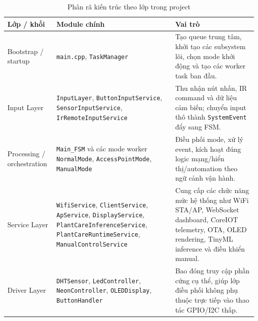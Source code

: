 \begin{table}[H]
\centering
\small
\begin{tabular}{|p{2.6cm}|p{4.8cm}|p{7.0cm}|}
\hline
\textbf{Lớp / khối} & \textbf{Module chính} & \textbf{Vai trò} \\
\hline
Bootstrap / startup & \texttt{main.cpp}, \texttt{TaskManager} & Tạo queue trung tâm, khởi tạo các subsystem lõi, chọn mode khởi động và tạo các worker task ban đầu. \\
\hline
Input Layer & \texttt{InputLayer}, \texttt{ButtonInputService}, \texttt{SensorInputService}, \texttt{IrRemoteInputService} & Thu nhận nút nhấn, IR command và dữ liệu cảm biến; chuyển input thô thành \texttt{SystemEvent} đẩy sang FSM. \\
\hline
Processing / orchestration & \texttt{Main\_FSM} và các mode worker \texttt{NormalMode}, \texttt{AccessPointMode}, \texttt{ManualMode} & Điều phối mode, xử lý event, kích hoạt đúng logic mạng/hiển thị/automation theo ngữ cảnh vận hành. \\
\hline
Service Layer & \texttt{WifiService}, \texttt{ClientService}, \texttt{ApService}, \texttt{DisplayService}, \texttt{PlantCareInferenceService}, \texttt{PlantCareRuntimeService}, \texttt{ManualControlService} & Cung cấp các chức năng mức hệ thống như WiFi STA/AP, WebSocket dashboard, CoreIOT telemetry, OTA, OLED rendering, TinyML inference và điều khiển manual. \\
\hline
Driver Layer & \texttt{DHTSensor}, \texttt{LedController}, \texttt{NeonController}, \texttt{OLEDDisplay}, \texttt{ButtonHandler} & Bao đóng truy cập phần cứng cụ thể, giúp lớp điều phối không phụ thuộc trực tiếp vào thao tác GPIO/I2C thấp. \\
\hline
\end{tabular}
\caption{Phân rã kiến trúc theo lớp trong project}
\label{tab:architecture-layers}
\end{table}

